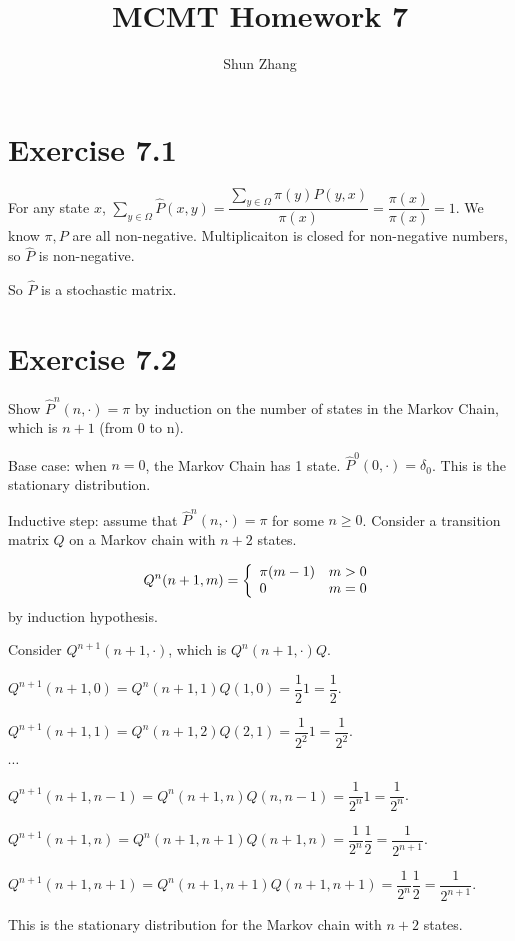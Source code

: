 \documentclass[10pt]{article}
\title{MCMT Homework 7}
\author{Shun Zhang}
\date{}
\begin{document}
\maketitle

\section*{Exercise 7.1}

For any state $x$, 
$\sum_{y \in \Omega} \hat{P}(x, y)
= \dfrac{\sum_{y \in \Omega} \pi(y) P(y, x)}{\pi(x)}
= \dfrac{\pi(x)}{\pi(x)}
= 1
$.
We know $\pi, P$ are all non-negative. Multiplicaiton is closed for non-negative
numbers, so $\hat{P}$ is non-negative.

So $\hat{P}$ is a stochastic matrix.

\section*{Exercise 7.2}

Show $\hat{P}^n (n, \cdot) = \pi$ by induction on the number of states in the
Markov Chain, which is $n+1$ (from 0 to n).

Base case: when $n = 0$, the Markov Chain has 1 state. $\hat{P}^0 (0, \cdot) =
\delta_0$. This is the stationary distribution.

Inductive step: assume that $\hat{P}^n (n, \cdot) = \pi$ for some $n \geq 0$.
Consider a transition matrix $Q$ on a Markov chain with $n+2$ states.
 
$$Q^n(n+1, m) = \left\{
\begin{array}{l l}
\pi(m - 1) & m > 0 \\
0 & m = 0
\end{array}
\right.
$$
by induction hypothesis.

Consider $Q^{n+1}(n+1, \cdot)$, which is $Q^{n}(n+1, \cdot) Q$.

$Q^{n+1}(n+1, 0) = Q^{n}(n+1, 1) Q(1, 0) = \dfrac{1}{2} 1 = \dfrac{1}{2}$.

$Q^{n+1}(n+1, 1) = Q^{n}(n+1, 2) Q(2, 1) = \dfrac{1}{2^2} 1 = \dfrac{1}{2^2}$.

$\cdots$

$Q^{n+1}(n+1, n-1) = Q^{n}(n+1, n) Q(n, n - 1) = \dfrac{1}{2^n} 1 =
\dfrac{1}{2^{n}}$.

$Q^{n+1}(n+1, n) = Q^{n}(n+1, n+1) Q(n+1, n) = \dfrac{1}{2^n} \dfrac{1}{2} =
\dfrac{1}{2^{n+1}}$.

$Q^{n+1}(n+1, n+1) = Q^{n}(n+1, n+1) Q(n+1, n+1) = \dfrac{1}{2^{n}} \dfrac{1}{2}
= \dfrac{1}{2^{n+1}}$.

This is the stationary distribution for the Markov chain with $n+2$ states.
\end{document}
